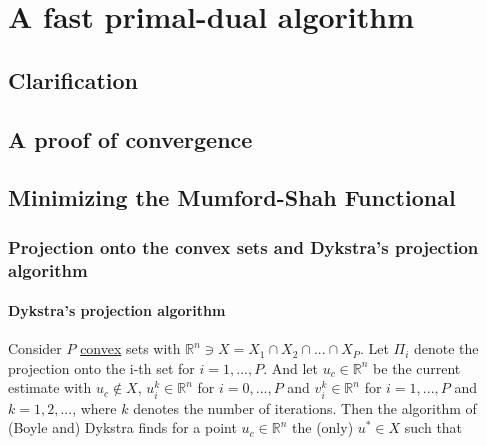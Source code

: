 \chapter{A fast primal-dual algorithm} %
\label{cha:a_fast_primal_dual_algorithm}


    \section{Clarification} %
    \label{sec:clarification}
        

    \section{A proof of convergence} %
    \label{sec:a_proof_of_convergence}
        

    \section{Minimizing the Mumford-Shah Functional} %
    \label{sec:minimizing_the_mumford_shah_functional}
    

        \subsection{Projection onto the convex sets and Dykstra's projection algorithm}

            \subsubsection{Dykstra's projection algorithm} %
            \label{sub:dykstra_s_projection_algorithm}


                Consider $P$ \underline{convex} sets with $\mathbb{R}^{n} \ni X = X_{1} \cap X_{2} \cap ... \cap X_{P}$. Let $\Pi_{i}$ denote the projection onto the i-th set for $i = 1, ..., P$. And let $u_{c} \in \mathbb{R}^{n}$ be the current estimate with $u_{c} \notin X$, $u_{i}^{k} \in \mathbb{R}^{n}$ for $i = 0, ..., P$ and $v_{i}^{k} \in \mathbb{R}^{n}$ for $i = 1, ..., P$ and $k = 1, 2, ...$, where $k$ denotes the number of iterations. Then the algorithm of (Boyle and) Dykstra finds for a point $u_{c} \in \mathbb{R}^{n}$ the (only) $u^{\ast} \in X$ such that

